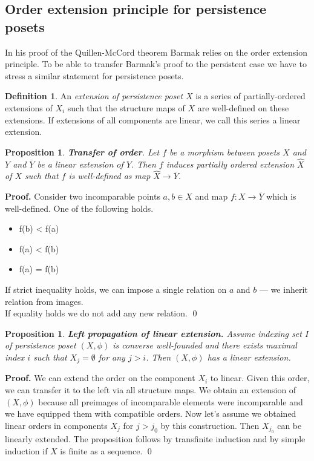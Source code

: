 \documentclass[english,12pt]{article}
\newcounter{stmcounter}[section]
\numberwithin{equation}{section}
\newtheorem{proposition}[stmcounter]{Proposition}
\theoremstyle{definition}
\newtheorem{definition}[stmcounter]{Definition}
\theoremstyle{remark}
\newenvironment{pf}{\noindent\textbf{Proof.}}{\qed}
\newcommand{\define}[1]{{\textit{#1}}}
\begin{document}
\subsection{Order extension principle for persistence posets}

In his proof of the Quillen-McCord theorem Barmak relies on the order extension principle. To be able to transfer Barmak's proof to the persistent case we have to stress a similar statement for persistence posets.

\begin{definition}
  An \define{extension of persistence poset} $X$ is a series of partially-ordered extensions of $X_i$ such that the structure maps of $X$ are well-defined on these extensions. If extensions of all components are linear, we call this series a linear extension.
\end{definition}

\begin{proposition}
  \textbf{Transfer of order}. Let $f$ be a morphism between posets $X$ and $Y$ and $\overline{Y}$ be a linear extension of $Y$. Then $f$ induces partially ordered extension $\hat{X}$ of $X$ such that $f$ is well-defined as map $\hat{X} \to \overline{Y}$.
\end{proposition}

\begin{pf}
  Consider two incomparable points $a, b \in X$ and map $f : X \to \overline{Y}$ which is well-defined. One of the following holds.\\
  \begin{itemize}
    \item f(b) < f(a)
    \item f(a) < f(b)
    \item f(a) = f(b)
  \end{itemize}
  If strict inequality holds, we can impose a single relation on $a$ and $b$ --- we inherit relation from images.\\
  If equality holds we do not add any new relation.
\end{pf}

\begin{proposition}
  \textbf{Left propagation of linear extension.} Assume indexing set $I$ of persistence poset $(X,\phi)$ is converse well-founded and there exists maximal index $i$ such that $X_j = \emptyset$ for any $j > i$. Then $(X,\phi)$ has a linear extension.
\end{proposition}

\begin{pf}
  We can extend the order on the component $X_i$ to linear. Given this order, we can transfer it to the left via all structure maps. We obtain an extension of $(X,\phi)$ because all preimages of incomparable elements were incomparable and we have equipped them with compatible orders. Now let's assume we obtained linear orders in components $X_j$ for $j > j_0$ by this construction. Then $X_{j_0}$ can be linearly extended. The proposition follows by transfinite induction and by simple induction if $X$ is finite as a sequence.
\end{pf}\\
\end{document}
